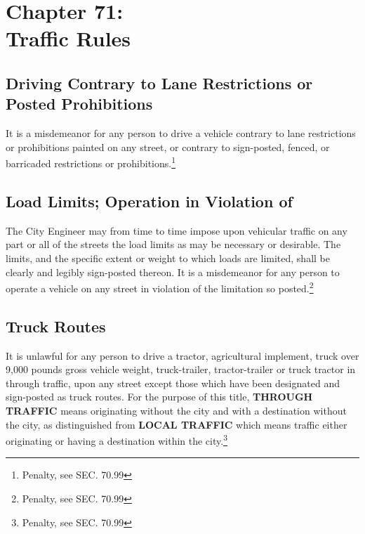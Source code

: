 \chapter*{Chapter 71: \\
	Traffic Rules}
    \vfill
    \minitoc
    \pagebreak


\section{Driving Contrary to Lane Restrictions or Posted Prohibitions}
It is a misdemeanor for any person to drive a vehicle contrary to lane restrictions or prohibitions painted on any street, or contrary to sign-posted, fenced, or barricaded restrictions or prohibitions.\footnote{Penalty, see SEC. 70.99}

\section{Load Limits; Operation in Violation of}
The City Engineer may from time to time impose upon vehicular traffic on any part or all of the streets the load limits as may be necessary or desirable. The limits, and the specific extent or weight to which loads are limited, shall be clearly and legibly sign-posted thereon. It is a misdemeanor for any person to operate a vehicle on any street in violation of the limitation so posted.\footnote{Penalty, see SEC. 70.99}

\section{Truck Routes}
It is unlawful for any person to drive a tractor, agricultural implement, truck over 9,000 pounds gross vehicle weight, truck-trailer, tractor-trailer or truck tractor in through traffic, upon any street except those which have been designated and sign-posted as truck routes.  For the purpose of this title, \textbf{THROUGH TRAFFIC} means originating without the city and with a destination without the city, as distinguished from \textbf{LOCAL TRAFFIC} which means traffic either originating or having a destination within the city.\footnote{Penalty, see SEC. 70.99}

